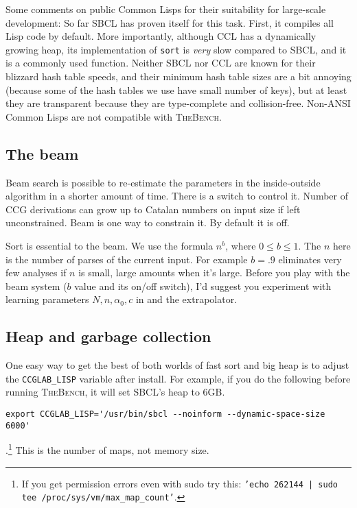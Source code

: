 \documentclass[11pt]{article}
\newcommand{\tool}{\textsc{TheBench}}
\begin{document}
{{{Some comments on public
{\sc Common Lisp}s for their suitability for large-scale development:}
So far SBCL has proven itself for this task. First, it compiles all Lisp code by default.
More importantly, although CCL has a dynamically growing heap, its implementation
of \texttt{sort} is \emph{very} slow compared to SBCL, and it is a commonly used function. Neither SBCL nor CCL are known for their blizzard hash table speeds, and their minimum
hash table sizes are a bit annoying (because some of the hash tables we use have small number of keys), but at least they are transparent because they are type-complete and collision-free. Non-ANSI Common Lisps are not compatible with \tool.

\subsection{The beam}
Beam search is possible to re-estimate the parameters in the inside-outside algorithm in a shorter amount of time. 
There is a switch to control it.
Number
of CCG derivations can grow up to Catalan numbers on input size if left unconstrained. Beam is one way to constrain it. By default it is off.

Sort is essential to the beam. We use the formula
$n^b$, where $0 \leq b\leq 1$.
The $n$ here is the number of parses of the current input.
For example $b=.9$ eliminates very few analyses if $n$ is small, large amounts when it's large.
Before you play with the beam system ($b$ value and its on/off switch), I'd suggest you experiment with learning  parameters
$N,n,\alpha_0,c$ in and the extrapolator.

\subsection{Heap and garbage collection}
{One easy way to get the best of both worlds of fast sort and big heap is to adjust the \texttt{CCGLAB\_LISP} variable
after install. For example, if you do the following before running \tool, it will set SBCL's heap to 6GB.}\medskip

\verb|export CCGLAB_LISP='/usr/bin/sbcl --noinform --dynamic-space-size 6000'|\medskip

}.\footnote{{If you get permission errors even with {sudo}
try this:} \texttt{'echo 262144 | sudo tee /proc/sys/vm/max\_map\_count'}.} {This is the number of maps, not memory size.}


}
\end{document}

